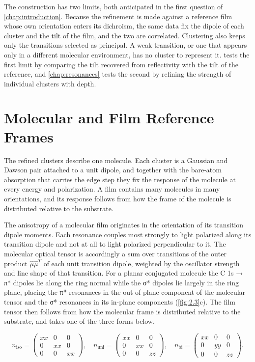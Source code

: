 The construction has two limits, both anticipated in the first question of \cref{chap:introduction}. Because the refinement is made against a reference film whose own orientation enters its dichroism, the same data fix the dipole of each cluster and the tilt of the film, and the two are correlated. Clustering also keeps only the transitions selected as principal. A weak transition, or one that appears only in a different molecular environment, has no cluster to represent it.  tests the first limit by comparing the tilt recovered from reflectivity with the tilt of the reference, and \cref{chap:resonances} tests the second by refining the strength of individual clusters with depth.

\section{Molecular and Film Reference Frames}\label{sec:molecular-and-film-reference-frames}

The refined clusters describe one molecule. Each cluster is a Gaussian and Dawson pair attached to a unit dipole, and together with the bare-atom absorption that carries the edge step they fix the response of the molecule at every energy and polarization. A film contains many molecules in many orientations, and its response follows from how the frame of the molecule is distributed relative to the substrate.

The anisotropy of a molecular film originates in the orientation of its transition dipole moments. Each resonance couples most strongly to light polarized along its transition dipole and not at all to light polarized perpendicular to it. The molecular optical tensor is accordingly a sum over transitions of the outer product \(\widehat{\mu}{\widehat{\mu}}^{T}\) of each unit transition dipole, weighted by the oscillator strength and line shape of that transition. For a planar conjugated molecule the C 1s → π* dipoles lie along the ring normal while the σ* dipoles lie largely in the ring plane, placing the π* resonances in the out-of-plane component of the molecular tensor and the σ* resonances in its in-plane components (\cref{fig:2.3}c). The film tensor then follows from how the molecular frame is distributed relative to the substrate, and takes one of the three forms below.

\begin{equation}
  n_{\mathrm{iso}} = \begin{pmatrix} xx & 0 & 0 \\ 0 & xx & 0 \\ 0 & 0 & xx \end{pmatrix},\quad
  n_{\mathrm{uni}} = \begin{pmatrix} xx & 0 & 0 \\ 0 & xx & 0 \\ 0 & 0 & zz \end{pmatrix},\quad
  n_{\mathrm{bi}} = \begin{pmatrix} xx & 0 & 0 \\ 0 & yy & 0 \\ 0 & 0 & zz \end{pmatrix}.
  \label{eq:tensor-symmetry}
\end{equation}

